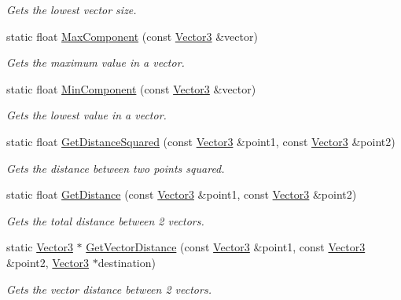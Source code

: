 \begin{DoxyCompactItemize}
\begin{DoxyCompactList}\small\item\em Gets the lowest vector size. \end{DoxyCompactList}\item 
static float \hyperlink{class_flounder_1_1_vector3_ab84d4943fc80e3215387b1458bf58709}{Max\+Component} (const \hyperlink{class_flounder_1_1_vector3}{Vector3} \&vector)
\begin{DoxyCompactList}\small\item\em Gets the maximum value in a vector. \end{DoxyCompactList}\item 
static float \hyperlink{class_flounder_1_1_vector3_a6494825b55af0c8d8bb9f8c6b5cb61ea}{Min\+Component} (const \hyperlink{class_flounder_1_1_vector3}{Vector3} \&vector)
\begin{DoxyCompactList}\small\item\em Gets the lowest value in a vector. \end{DoxyCompactList}\item 
static float \hyperlink{class_flounder_1_1_vector3_ae30f3777f5426d79369d3ff182d4a51c}{Get\+Distance\+Squared} (const \hyperlink{class_flounder_1_1_vector3}{Vector3} \&point1, const \hyperlink{class_flounder_1_1_vector3}{Vector3} \&point2)
\begin{DoxyCompactList}\small\item\em Gets the distance between two points squared. \end{DoxyCompactList}\item 
static float \hyperlink{class_flounder_1_1_vector3_a84706b38d860179365a97c532154af85}{Get\+Distance} (const \hyperlink{class_flounder_1_1_vector3}{Vector3} \&point1, const \hyperlink{class_flounder_1_1_vector3}{Vector3} \&point2)
\begin{DoxyCompactList}\small\item\em Gets the total distance between 2 vectors. \end{DoxyCompactList}\item 
static \hyperlink{class_flounder_1_1_vector3}{Vector3} $\ast$ \hyperlink{class_flounder_1_1_vector3_ab1589c8b0a68945ecb3d0d68bf70e008}{Get\+Vector\+Distance} (const \hyperlink{class_flounder_1_1_vector3}{Vector3} \&point1, const \hyperlink{class_flounder_1_1_vector3}{Vector3} \&point2, \hyperlink{class_flounder_1_1_vector3}{Vector3} $\ast$destination)
\begin{DoxyCompactList}\small\item\em Gets the vector distance between 2 vectors. \end{DoxyCompactList}\item 

\end{DoxyCompactItemize}
